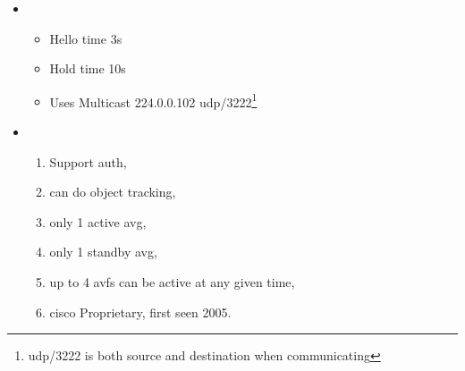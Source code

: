 \begin{itemize}
    \item {}
    \begin{itemize}
        \item Hello time 3s
        \item Hold time 10s
        \item Uses Multicast 224.0.0.102 udp/3222\footnote{udp/3222 is both source and destination when communicating}
    \end{itemize}
    \item {}
    \begin{enumerate}
        \item Support auth,
        \item can do object tracking,
        \item only 1 active \gls{avg},
        \item only 1 standby \gls{avg},
        \item up to 4 \glspl{avf} can be active at any given time,
        \item cisco Proprietary, first seen 2005.
    \end{enumerate}
\end{itemize}
